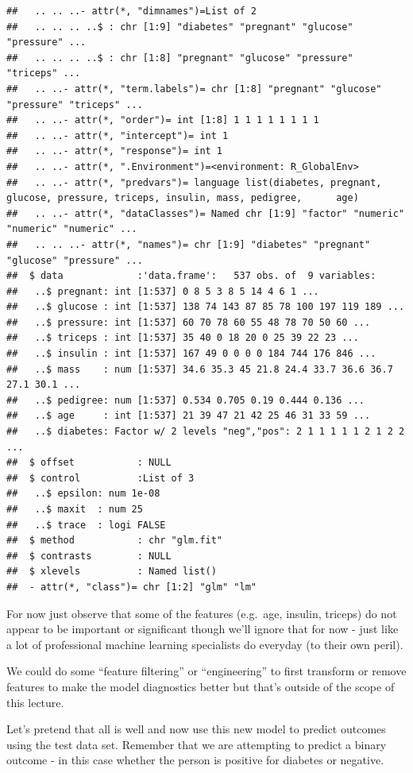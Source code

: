 \documentclass[
]{article}
\begin{document}
\begin{verbatim}
##   .. .. ..- attr(*, "dimnames")=List of 2
##   .. .. .. ..$ : chr [1:9] "diabetes" "pregnant" "glucose" "pressure" ...
##   .. .. .. ..$ : chr [1:8] "pregnant" "glucose" "pressure" "triceps" ...
##   .. ..- attr(*, "term.labels")= chr [1:8] "pregnant" "glucose" "pressure" "triceps" ...
##   .. ..- attr(*, "order")= int [1:8] 1 1 1 1 1 1 1 1
##   .. ..- attr(*, "intercept")= int 1
##   .. ..- attr(*, "response")= int 1
##   .. ..- attr(*, ".Environment")=<environment: R_GlobalEnv> 
##   .. ..- attr(*, "predvars")= language list(diabetes, pregnant, glucose, pressure, triceps, insulin, mass, pedigree,      age)
##   .. ..- attr(*, "dataClasses")= Named chr [1:9] "factor" "numeric" "numeric" "numeric" ...
##   .. .. ..- attr(*, "names")= chr [1:9] "diabetes" "pregnant" "glucose" "pressure" ...
##  $ data             :'data.frame':   537 obs. of  9 variables:
##   ..$ pregnant: int [1:537] 0 8 5 3 8 5 14 4 6 1 ...
##   ..$ glucose : int [1:537] 138 74 143 87 85 78 100 197 119 189 ...
##   ..$ pressure: int [1:537] 60 70 78 60 55 48 78 70 50 60 ...
##   ..$ triceps : int [1:537] 35 40 0 18 20 0 25 39 22 23 ...
##   ..$ insulin : int [1:537] 167 49 0 0 0 0 184 744 176 846 ...
##   ..$ mass    : num [1:537] 34.6 35.3 45 21.8 24.4 33.7 36.6 36.7 27.1 30.1 ...
##   ..$ pedigree: num [1:537] 0.534 0.705 0.19 0.444 0.136 ...
##   ..$ age     : int [1:537] 21 39 47 21 42 25 46 31 33 59 ...
##   ..$ diabetes: Factor w/ 2 levels "neg","pos": 2 1 1 1 1 1 2 1 2 2 ...
##  $ offset           : NULL
##  $ control          :List of 3
##   ..$ epsilon: num 1e-08
##   ..$ maxit  : num 25
##   ..$ trace  : logi FALSE
##  $ method           : chr "glm.fit"
##  $ contrasts        : NULL
##  $ xlevels          : Named list()
##  - attr(*, "class")= chr [1:2] "glm" "lm"
\end{verbatim}

For now just observe that some of the features (e.g.~age, insulin,
triceps) do not appear to be important or significant though we'll
ignore that for now - just like a lot of professional machine learning
specialists do everyday (to their own peril).

We could do some ``feature filtering'' or ``engineering'' to first
transform or remove features to make the model diagnostics better but
that's outside of the scope of this lecture.

Let's pretend that all is well and now use this new model to predict
outcomes using the test data set. Remember that we are attempting to
predict a binary outcome - in this case whether the person is positive
for diabetes or negative.
\end{document}
